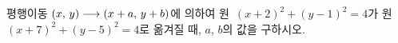 평행이동 $(x,\mkern3mu y)\longrightarrow(x+a,\mkern3mu y+b)$에 의하여 원~$(x+2)^2+(y-1)^2=4$가 원~$(x+7)^2+(y-5)^2=4$로 옮겨질 때, $a$, $b$의 값을 구하시오.
